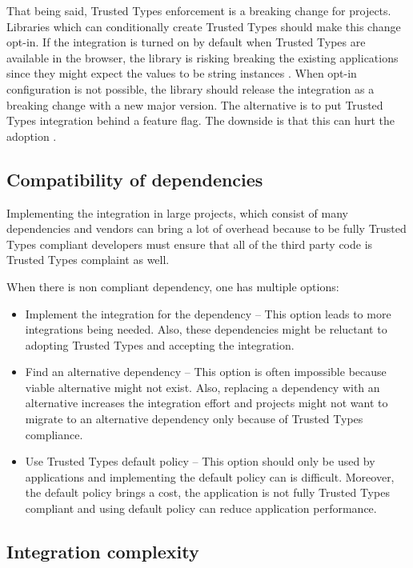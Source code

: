That being said, Trusted Types enforcement is a breaking change for projects. Libraries which can
conditionally create Trusted Types should make this change opt-in. If the integration is turned on
by default when Trusted Types are available in the browser, the library is risking breaking the
existing applications since they might expect the values to be string instances
\cite{dom_purify_breakage}. When opt-in configuration is not possible, the library should release
the integration as a breaking change with a new major version. The alternative is to put Trusted
Types integration behind a feature flag. The downside is that this can hurt the adoption
\cite{react_tt_feature_flag}.

\subsection{Compatibility of dependencies}
\label{sub:tt_compatibility_in_deps}

Implementing the integration in large projects, which consist of many dependencies and vendors can
bring a lot of overhead because to be fully Trusted Types compliant developers must ensure that all
of the third party code is Trusted Types complaint as well.

When there is non compliant dependency, one has multiple options:

\begin{itemize}
  \item Implement the integration for the dependency -- This option leads to more integrations being
        needed. Also, these dependencies might be reluctant to adopting Trusted Types and accepting
        the integration.
  \item Find an alternative dependency -- This option is often impossible because viable alternative
        might not exist. Also, replacing a dependency with an alternative increases the integration
        effort and projects might not want to migrate to an alternative dependency only because of
        Trusted Types compliance.
  \item Use Trusted Types default policy -- This option should only be used by applications and
        implementing the default policy can is difficult. Moreover, the default policy brings a
        cost, the application is not fully Trusted Types compliant and using default policy can
        reduce application performance.
\end{itemize}

\subsection{Integration complexity}
\label{sub:trust_integration_author}

